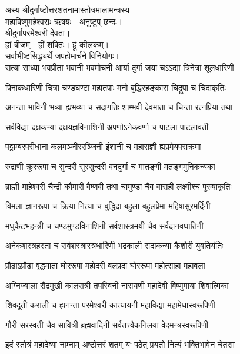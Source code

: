 
अस्य श्रीदुर्गाष्टोत्तरशतनामास्तोत्रमालामन्त्रस्य\\
महाविष्णुमहेश्वराः ऋषयः। अनुष्टुप् छन्दः।\\
श्रीदुर्गापरमेश्वरी देवता।\\
ह्रां बीजम्। ह्रीं शक्तिः। ह्रूं कीलकम्।\\
सर्वाभीष्टसिद्ध्यर्थे जपहोमार्चने विनियोगः।\\

\nopagebreak[4]
\twolineshloka
{सत्या साध्या भवप्रीता भवानी भवमोचनी}
{आर्या दुर्गा जया चऽऽद्या त्रिनेत्रा शूलधारिणी}

\twolineshloka
{पिनाकधारिणी चित्रा चण्डघण्टा महातपाः}
{मनो बुद्धिरहङ्कारा चिद्रूपा च चिदाकृतिः}

\twolineshloka
{अनन्ता भाविनी भव्या ह्यभव्या च सदागतिः}
{शाम्भवी देवमाता च चिन्ता रत्नप्रिया तथा}

\twolineshloka
{सर्वविद्या दक्षकन्या दक्षयज्ञविनाशिनी}
{अपर्णाऽनेकवर्णा च पाटला पाटलावती}

\twolineshloka
{पट्टाम्बरपरीधाना कलमञ्जीररञ्जिनी}
{ईशानी च महाराज्ञी ह्यप्रमेयपराक्रमा}

\twolineshloka
{रुद्राणी क्रूररूपा च सुन्दरी सुरसुन्दरी}
{वनदुर्गा च मातङ्गी मतङ्गमुनिकन्यका}

\twolineshloka
{ब्राह्मी माहेश्वरी चैन्द्री कौमारी वैष्णवी तथा}
{चामुण्डा चैव वाराही लक्ष्मीश्च पुरुषाकृतिः}

\twolineshloka
{विमला ज्ञानरूपा च क्रिया नित्या च बुद्धिदा}
{बहुला बहुलप्रेमा महिषासुरमर्दिनी}

\twolineshloka
{मधुकैटभहन्त्री च चण्डमुण्डविनाशिनी}
{सर्वशास्त्रमयी चैव सर्वदानवघातिनी}

\twolineshloka
{अनेकशस्त्रहस्ता च सर्वशस्त्रास्त्रधारिणी}
{भद्रकाली सदाकन्या कैशोरी युवतिर्यतिः}

\twolineshloka
{प्रौढाऽप्रौढा वृद्धमाता घोररूपा महोदरी}
{बलप्रदा घोररूपा महोत्साहा महाबला}

\twolineshloka
{अग्निज्वाला रौद्रमुखी कालरात्री तपस्विनी}
{नारायणी महादेवी विष्णुमाया शिवात्मिका}

\twolineshloka
{शिवदूती कराली च ह्यनन्ता परमेश्वरी}
{कात्यायनी महाविद्या महामेधास्वरूपिणी}

\twolineshloka
{गौरी सरस्वती चैव सावित्री ब्रह्मवादिनी}
{सर्वतत्त्वैकनिलया वेदमन्त्रस्वरूपिणी}

\nopagebreak[4]
\twolineshloka
{इदं स्तोत्रं महादेव्या नाम्नाम् अष्टोत्तरं शतम्}
{यः पठेत् प्रयतो नित्यं भक्तिभावेन चेतसा}

